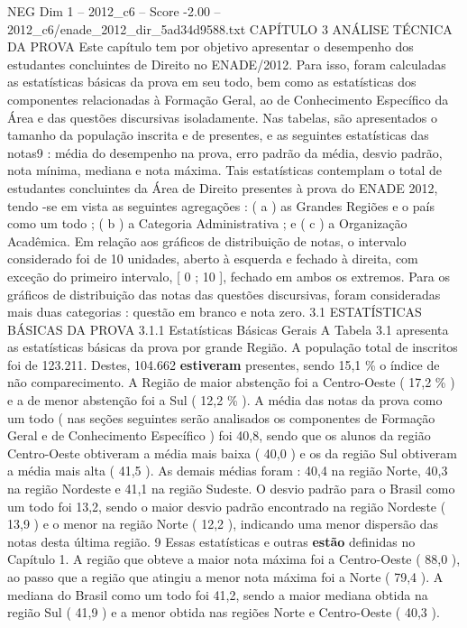 \begin{textsample}{NEG Dim 1 – 2012\_c6 – Score -2.00 – 2012\_c6/enade\_2012\_dir\_5ad34d9588.txt}  \label{ex:f1_neg_255}
CAPÍTULO 3 ANÁLISE TÉCNICA DA PROVA Este capítulo tem por objetivo apresentar o desempenho dos estudantes concluintes de Direito no ENADE/2012.
Para isso, foram calculadas as estatísticas básicas da prova em seu todo, bem como as estatísticas dos componentes relacionadas à Formação Geral, ao de Conhecimento Específico da Área e das questões discursivas isoladamente.
Nas tabelas, são apresentados o tamanho da população inscrita e de presentes, e as seguintes estatísticas das notas9 : média do desempenho na prova, erro padrão da média, desvio padrão, nota mínima, mediana e nota máxima.
Tais estatísticas contemplam o total de estudantes concluintes da Área de Direito presentes à prova do ENADE 2012, tendo -se em vista as seguintes agregações : ( a ) as Grandes Regiões e o país como um todo ; ( b ) a Categoria Administrativa ; e ( c ) a Organização Acadêmica.
Em relação aos gráficos de distribuição de notas, o intervalo considerado foi de 10 unidades, aberto à esquerda e fechado à direita, com exceção do primeiro intervalo, [ 0 ; 10 ], fechado em ambos os extremos.
Para os gráficos de distribuição das notas das questões discursivas, foram consideradas mais duas categorias : questão em branco e nota zero. 3.1 ESTATÍSTICAS BÁSICAS DA PROVA 3.1.1 Estatísticas Básicas Gerais A Tabela 3.1 apresenta as estatísticas básicas da prova por grande Região.
A população total de inscritos foi de 123.211.
Destes, 104.662 \textbf{estiveram} presentes, sendo 15,1 \% o índice de não comparecimento.
A Região de maior abstenção foi a Centro-Oeste ( 17,2 \% ) e a de menor abstenção foi a Sul ( 12,2 \% ).
A média das notas da prova como um todo ( nas seções seguintes serão analisados os componentes de Formação Geral e de Conhecimento Específico ) foi 40,8, sendo que os alunos da região Centro-Oeste obtiveram a média mais baixa ( 40,0 ) e os da região Sul obtiveram a média mais alta ( 41,5 ).
As demais médias foram : 40,4 na região Norte, 40,3 na região Nordeste e 41,1 na região Sudeste.
O desvio padrão para o Brasil como um todo foi 13,2, sendo o maior desvio padrão encontrado na região Nordeste ( 13,9 ) e o menor na região Norte ( 12,2 ), indicando uma menor dispersão das notas desta última região. 9 Essas estatísticas e outras \textbf{estão} definidas no Capítulo 1.
A região que obteve a maior nota máxima foi a Centro-Oeste ( 88,0 ), ao passo que a região que atingiu a menor nota máxima foi a Norte ( 79,4 ).
A mediana do Brasil como um todo foi 41,2, sendo a maior mediana obtida na região Sul ( 41,9 ) e a menor obtida nas regiões Norte e Centro-Oeste ( 40,3 ).

\end{textsample}
